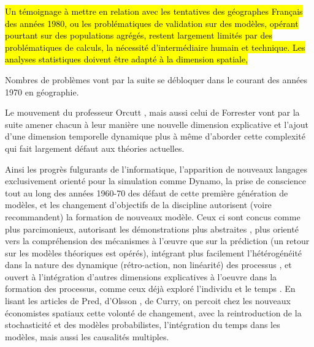 \hl{Un témoignage à mettre en relation avec les tentatives des géographes Français des années 1980, ou les problématiques de validation sur des modèles, opérant pourtant sur des populations agrégés, restent largement limités par des problématiques de calculs, la nécessité d'intermédiaire humain et technique. Les analyses statistiques doivent être adapté à la dimension spatiale,} %





Nombres de problèmes vont par la suite se débloquer dans le courant des années 1970 en géographie.


Le mouvement du professeur Orcutt \autocite{Orcutt1957}, mais aussi celui de Forrester \autocite{Forrester1961, Forrester1969} vont par la suite amener chacun à leur manière une nouvelle dimension explicative et l'ajout d'une dimension temporelle dynamique plus à même d'aborder cette complexité qui fait largement défaut aux théories actuelles. \autocite[p295]{Batty1976}

Ainsi les progrès fulgurants de l'informatique, l'apparition de nouveaux langages exclusivement orienté pour la simulation comme Dynamo, la prise de conscience tout au long des années 1960-70 des défaut de cette première génération de modèles, et les changement d'objectifs de la discipline \autocite[12]{Batty1994} \autocite{Boyce1988} autorisent (voire recommandent) la formation de nouveaux modèle. Ceux ci sont concus comme plus parcimonieux, autorisant les démonstrations plus abstraites \autocite{Forrester1969}, plus orienté vers la compréhension des mécanismes à l’œuvre que sur la prédiction (un retour sur les modèles théoriques est opérés), intégrant plus facilement l'hétérogénéité dans la nature des dynamique (rétro-action, non linéarité) des processus \autocite{Forrester1969, Wilson1970, Allen1978}, et ouvert à l'intégration d'autres dimensions explicatives à l'oeuvre dans la formation des processus, comme ceux déjà exploré l'individu et le temps \autocite{Hagerstrand1967a,Orcutt1957,Forrester1961}. En lisant les articles de Pred, d'Olsson \autocite{Olsson1969,Olsson1970}, de Curry, on percoit chez les nouveaux économistes spatiaux cette volonté de changement, avec la reintroduction de la stochasticité et des modèles probabilistes, l'intégration du temps dans les modèles, mais aussi les causalités multiples.

